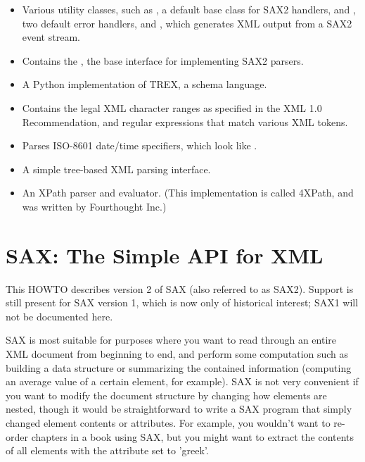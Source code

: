 \documentclass{howto}
\newcommand{\element}[1]{\code{#1}}
\newcommand{\attribute}[1]{\code{#1}}
\begin{document}
\begin{itemize}
\item[\module{xml.sax.saxutils}]
  Various utility classes, such as , a default
  base class for SAX2 handlers,  and
  , two default error handlers, and
  , which generates XML output from a SAX2 event stream.
  
\item[\module{xml.sax.xmlreader}]
  Contains the , the base interface for implementing 
  SAX2 parsers.

\item[\module{xml.schema.trex}]
  A Python implementation of TREX, a schema language.

\item[\module{xml.utils.characters}]
  Contains the legal XML character ranges as specified in the XML 1.0
  Recommendation, and regular expressions that match various
  XML tokens.
  
\item[\module{xml.utils.iso8601}]
  Parses ISO-8601 date/time specifiers, which look like 
  .
  
\item[\module{xml.utils.qp_xml}]
  A simple tree-based XML parsing interface.  

\item[\module{xml.xpath}]
  An XPath parser and evaluator.
  (This implementation is called 4XPath, and was written by Fourthought Inc.)

\begin{comment}
\item[\module{xml.xslt}] 
   An implementation of the XSLT transformation language.
  (This implementation is called 4XSLT, and was written by Fourthought Inc.)
\end{comment}

\end{itemize}


\section{SAX: The Simple API for XML\label{section-SAX}}


This HOWTO describes version 2 of SAX (also referred to as SAX2).
Support is still present for SAX version 1, which is now only of
historical interest; SAX1 will not be documented here.

SAX is most suitable for purposes where you want to read through an
entire XML document from beginning to end, and perform some
computation such as building a data structure or summarizing the
contained information (computing an average value of a certain
element, for example).  SAX is not very convenient if you want to
modify the document structure by changing how elements are nested,
though it would be straightforward to write a SAX program that simply
changed element contents or attributes.  For example, you wouldn't
want to re-order chapters in a book using SAX, but you might want to
extract the contents of all \element{name} elements with the attribute
\attribute{lang} set to 'greek'.
\end{document}
